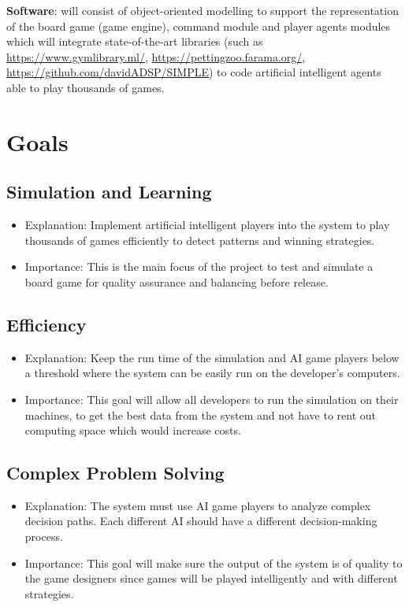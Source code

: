 \documentclass{article}
\begin{document}
\textbf{Software}: will consist of object-oriented modelling to support the representation
of the board game (game engine), command module and player agents modules which will integrate state-of-the-art libraries (such as
\url{https://www.gymlibrary.ml/}, \url{https://pettingzoo.farama.org/}, \url{https://github.com/davidADSP/SIMPLE}) to code artificial intelligent agents able to play thousands of
games.

\section{Goals}
\subsection{Simulation and Learning}
\begin{itemize}
\item Explanation: Implement artificial intelligent players into the system to play thousands of games efficiently to detect patterns and winning strategies.
\item Importance: This is the main focus of the project to test and simulate a board game for quality assurance and balancing before release.
\end{itemize}

\subsection{Efficiency}
\begin{itemize}
\item Explanation: Keep the run time of the simulation and AI game players below a threshold where the system can be easily run on the developer's computers.
\item Importance: This goal will allow all developers to run the simulation on their machines, to get the best data from the system and not have to rent out computing space which would increase costs.
\end{itemize}

\subsection{Complex Problem Solving}
\begin{itemize}
\item Explanation: The system must use AI game players to analyze complex decision paths. Each different AI should have a different decision-making process.
\item Importance: This goal will make sure the output of the system is of quality to the game designers since games will be played intelligently and with different strategies.
\end{itemize}
\end{document}
